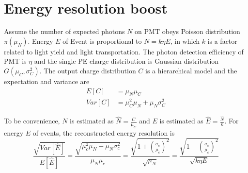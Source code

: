 \section{Energy resolution boost}
\label{Result}
Assume the number of expected photons $N$ on PMT obeys Poisson distribution $\pi(\mu_N)$. Energy $E$ of Event is proportional to $N=k\eta E$, in which $k$ is a factor related to light yield and light transportation. The photon detection efficiency of PMT is $\eta$ and the single PE charge distribution is Gaussian distribution $G(\mu_C,\sigma_C^2)$. The output charge distribution $C$ is a hierarchical model and the expectation and variance are
\begin{align}
    E[C]&=\mu_N\mu_C\\
    Var[C]&=\mu_C^2\mu_N+\mu_N\sigma_C^2
\end{align}

To be convenience, $N$ is estimated as $\hat{N}=\frac{C}{\mu_C}$ and $E$ is estimated as $\hat{E}=\frac{\hat{N}}{k}$. For  energy $E$ of events, the reconstructed energy resolution is 
\begin{equation}
    \frac{\sqrt{Var[\hat{E}]}}{E[\hat{E}]}=\frac{\sqrt{\mu_c^2\mu_N+\mu_N\sigma_c^2}}{\mu_N\mu_c}=\frac{\sqrt{1+(\frac{\sigma_c}{\mu_c})^2}}{\sqrt{\mu_N}}=\frac{\sqrt{1+(\frac{\sigma_c}{\mu_c})^2}}{\sqrt{k\eta E}}
\end{equation}

